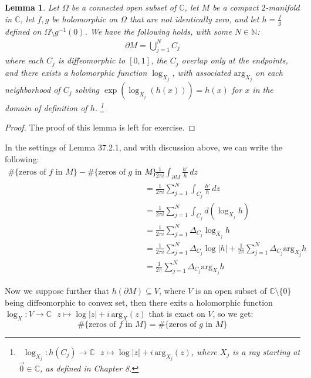 \documentclass[11pt,oneside]{book}
\theoremstyle{break}
\theoremstyle{break}
\newtheorem{lem}{Lemma}[thm]
\newcommand{\N}{\mathbb{N}}
\newcommand{\Complex}{\mathbb{C}}
\begin{document}
\begin{lem}
Let $\Omega$ be a connected open subset of $\Complex$, let $M$ be a compact $2$-manifold in $\Complex$, let $f,g$ be holomorphic on $\Omega$ that are not identically zero, and let $h = \frac{f}{g}$ defined on $\Omega \setminus g^{-1}(0)$. We have the following holds, with some $N \in \N$:
\begin{align*}
\partial M  = \bigcup_{j=1}^N C_j
\end{align*} 
where each $C_j$ is diffeomorphic to $[0,1]$, the $C_j$ overlap only at the endpoints, and there exists a holomorphic function $\log_{X_j}$, with associated $\text{arg}_{X_j} $ on each neighborhood of $C_j$ solving $\exp(\log_{X_j} (h(x))) = h(x)$ for $x $ in the domain of definition of $h$. \footnote{\ $ \log_{X_j}: h(C_j) \to \Complex \ \ \  z \mapsto \log |z| + i\, \text{arg}_{X_j}(z)$, where $X_j$ is a ray starting at $\vec{0}\in \Complex$, as defined in Chapter 8.}
\end{lem}
\begin{proof}
The proof of this lemma is left for exercise.
\end{proof}



In the settings of Lemma 37.2.1, and with discussion above, we can write the following:
\begin{align*}
\#\{\text{zeros of }f \text{ in }M\} - \#\{\text{zeros of }g \text{ in }M\}  &= \frac{1}{2\pi i}\int_{\partial M}\frac{h'}{h}\, dz \\
&= \frac{1}{2\pi i}\sum_{j=1}^N \int_{C_j}\frac{h'}{h}\, dz\\
&= \frac{1}{2\pi i}\sum_{j=1}^N \int_{C_j} d(\log_{X_j} h)\\
&= \frac{1}{2\pi i}\sum_{j=1}^N \Delta_{C_j}\log_{X_j} h\\
&= \frac{1}{2\pi i} \sum_{j=1}^{N} \Delta_{C_j}\log|h| + \frac{1}{2\pi}\sum_{j=1}^N \Delta_{C_j} \text{arg}_{X_j} h \\
&= \frac{1}{2\pi} \sum_{j=1}^N \Delta_{C_j} \text{arg}_{X_j} h
\end{align*}

Now we suppose further that $h(\partial M) \subseteq V$, where $V$ is an open subset of $\Complex \setminus \{0\}$ being diffeomorphic to convex set, then there exits a holomorphic function $\log_{X}:V \to \Complex\ \ \ z\mapsto \log|z|+i\,\text{arg}_{X}(z)$ that is exact on $V$, so we get:
$$\# \{\text{zeros of }f\text{ in }M\}=\# \{\text{zeros of }g\text{ in }M\} $$
\end{document}
